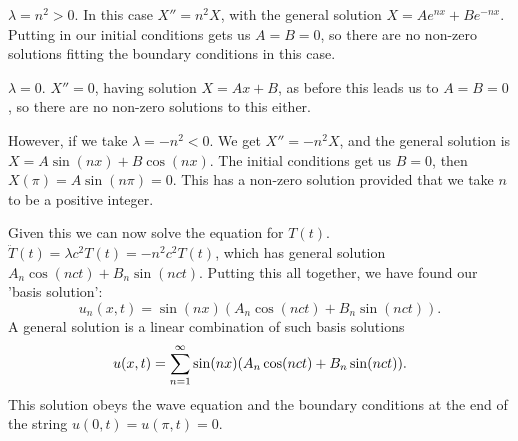 \documentclass[10pt, a4paper]{article}
\begin{document}
\begin{example}
\begin{solution}
        $\lambda = n ^ 2 > 0$.
        In this case $X'' = n ^ 2X$,
        with the general solution $X = Ae ^ {nx} + Be ^ {-nx}$.
        Putting in our initial conditions gets us $A = B = 0$,
        so there are no non-zero solutions fitting the boundary conditions in this case.

        $\lambda = 0$.
        $X'' = 0$,
        having solution $X = Ax + B$,
        as before this leads us to $A = B = 0$,
        so there are no non-zero solutions to this either.

        However,
        if we take $\lambda = -n ^ 2 < 0$.
        We get $X'' = -n ^ 2X$,
        and the general solution is $X =  A\sin(nx) + B\cos(nx)$.
        The initial conditions get us $B = 0$,
        then $X(\pi) = A\sin(n\pi) = 0$.
        This has a non-zero solution provided that we take $n$ to be a positive integer.



        Given this we can now solve the equation for $T(t)$.
        $\ddot{T}(t) = \lambda c ^ 2T(t) = -n ^ 2c ^ 2T(t)$,
        which has general solution $A_n\cos(nct) + B_n\sin(nct)$.
        Putting this all together,
        we have found our 'basis solution':
        \[
        u_n(x, t) = \sin(nx)(A_n\cos(nct) + B_n\sin(nct)).
        \]
        A general solution is a linear combination of such basis solutions
        \[
        u(x, t) = \infsum[n = 1]\sin(nx)(A_n\cos(nct) + B_n\sin(nct)).
        \]
        This solution obeys the wave equation and the boundary conditions at the end of the string $u(0, t) = u(\pi, t) = 0$.
        

\end{solution}
\end{example}
\end{document}
